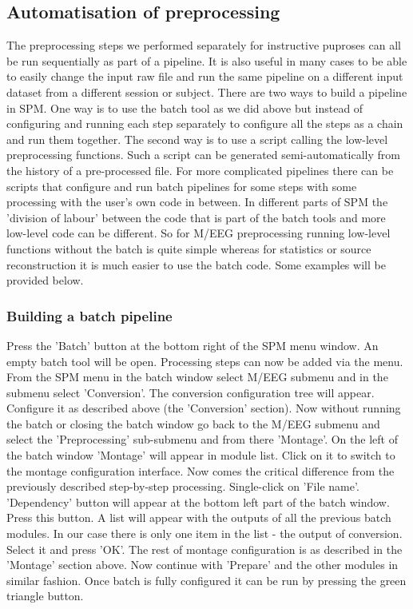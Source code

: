 \subsection{Automatisation of preprocessing}
The preprocessing steps we performed separately for instructive puproses can all be run sequentially as part of a pipeline. It is also useful in many cases to be able to easily change the input raw file and run the same pipeline on a different input dataset from a different session or subject. There are two ways to build a pipeline in SPM. One way is to use the batch tool as we did above but instead of configuring and running each step separately to configure all the steps as a chain and run them together. The second way is to use a script calling the low-level preprocessing functions. Such a script can be generated semi-automatically from the history of a pre-processed file. For more complicated pipelines there can be scripts that configure and run batch pipelines for some steps with some processing with the user's own code in between. In different parts of SPM the 'division of labour' between the code that is part of the batch tools and more low-level code can be different. So for M/EEG preprocessing running low-level functions without the batch is quite simple whereas for statistics or source reconstruction it is much easier to use the batch code. Some examples will be provided below.

\subsubsection{Building a batch pipeline}
Press the 'Batch' button at the bottom right of the SPM menu window.  An empty batch tool will be open. Processing steps can now be added via the menu. From the SPM menu in the batch window select M/EEG submenu and in the submenu select 'Conversion'. The conversion configuration tree will appear. Configure it as described above (the 'Conversion' section).  Now without running the batch or closing the batch window go back to the M/EEG submenu and select the 'Preprocessing' sub-submenu and from there 'Montage'.  On the left of the batch window 'Montage' will appear in module list.  Click on it to switch to the montage configuration interface.  Now comes the critical difference from the previously described step-by-step processing. Single-click on 'File name'. 'Dependency' button will appear at the bottom left part of the batch window. Press this button. A list will appear with the outputs of all the previous batch modules. In our case there is only one item in the list - the output of conversion. Select it and press 'OK'. The rest of montage configuration is as described in the 'Montage' section above. Now continue with 'Prepare' and the other modules in similar fashion. Once batch is fully configured it can be run by pressing the green triangle button.

